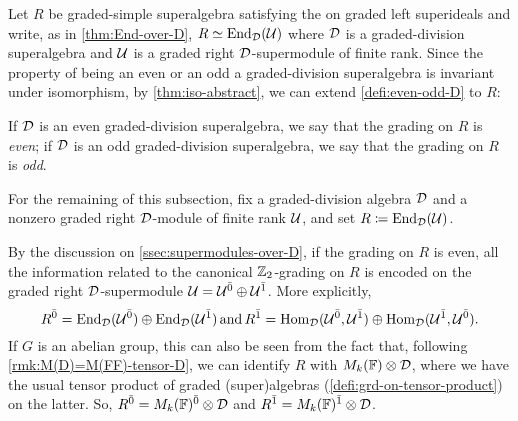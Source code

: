 
Let $R$ be graded-simple superalgebra satisfying the \dcc on graded left superideals and write, as in \cref{thm:End-over-D}, $R\simeq \operatorname{End}_{\mathcal{D}} (\mathcal U)$ where $\mathcal{D}$ is a graded-division superalgebra and $\mathcal U$ is a graded right $\mathcal{D}$-supermodule of finite rank. 
Since the property of being an even or an odd a graded-division superalgebra is invariant under isomorphism, by \cref{thm:iso-abstract}, we can extend \cref{defi:even-odd-D} to $R$:

\begin{defi}\label{defi:even-odd-R}
    If $\mathcal{D}$ is an even graded-division superalgebra, we say that the grading on $R$ is \emph{even}; if $\mathcal{D}$ is an odd graded-division superalgebra, we say that the grading on $R$ is \emph{odd}. 
\end{defi}

For the remaining of this subsection, fix a graded-division algebra $\mathcal{D}$ and a nonzero graded right $\mathcal{D}$-module of finite rank $\mathcal U$, and set $R \coloneqq \operatorname{End}_{\mathcal{D}} (\mathcal U)$. 

By the discussion on \cref{ssec:supermodules-over-D}, if the grading on $R$ is even, all the information related to the canonical $\mathbb{Z}_2$-grading on $R$ is encoded on the graded right $\mathcal{D}$-supermodule $\mathcal U=\mathcal U^{\bar0} \oplus \mathcal U^{\bar1}$. 
More explicitly, 
\[\label{eq:almost-ZZ-grading}
    R^{\bar0} = \operatorname{End}_{\mathcal{D}}(\mathcal U^{\bar0}) \oplus \operatorname{End}_{\mathcal{D}}(\mathcal U^{\bar1}) \,\text{and}\, R^{\bar1} = \operatorname{Hom}_{\mathcal{D}}(\mathcal U^{\bar0}, \mathcal U^{\bar1}) \oplus \operatorname{Hom}_{\mathcal{D}}(\mathcal U^{\bar1}, \mathcal U^{\bar0}).
\]
If $G$ is an abelian group, this can also be seen from the fact that, following \cref{rmk:M(D)=M(FF)-tensor-D}, we can identify  $R$ with $M_k(\mathbb{F})\otimes \mathcal{D}$, where we have the usual tensor product of graded (super)algebras (\cref{defi:grd-on-tensor-product}) on the latter. So, $R^{\bar0} = M_k(\mathbb{F})^{\bar0} \otimes \mathcal{D}$ and $R^{\bar1} = M_k(\mathbb{F})^{\bar1} \otimes \mathcal{D}$. 

